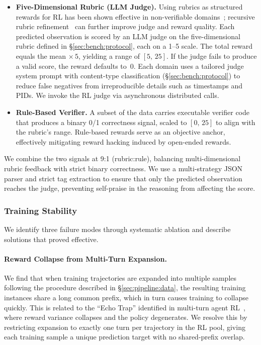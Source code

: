 \documentclass{llmxive}
\begin{document}
\begin{itemize}[leftmargin=1.5em,itemsep=2pt]
    \item \textbf{Five-Dimensional Rubric (LLM Judge).}
    Using rubrics as structured rewards for RL has been shown effective in non-verifiable domains~\citep{gunjal2025rubrics}; recursive rubric refinement~\citep{shen2026rethinking} can further improve judge and reward quality.
    Each predicted observation is scored by an LLM judge on the five-dimensional rubric defined in \S\ref{sec:bench:protocol}, each on a 1--5 scale.
    The total reward equals the mean $\times\,5$, yielding a range of $[5,\,25]$.
    If the judge fails to produce a valid score, the reward defaults to~0.
    Each domain uses a tailored judge system prompt with content-type classification (\S\ref{sec:bench:protocol}) to reduce false negatives from irreproducible details such as timestamps and PIDs.
    We invoke the RL judge via asynchronous distributed calls.

    \item \textbf{Rule-Based Verifier.}
    A subset of the data carries executable verifier code that produces a binary 0/1 correctness signal, scaled to $[0,\,25]$ to align with the rubric's range.
    Rule-based rewards serve as an objective anchor, effectively mitigating reward hacking induced by open-ended rewards.

\end{itemize}

We combine the two signals at 9{:}1 (rubric{:}rule), balancing multi-dimensional rubric feedback with strict binary correctness.
We use a multi-strategy JSON parser and strict tag extraction to ensure that only the predicted observation reaches the judge, preventing self-praise in the reasoning from affecting the score.


\subsubsection{Training Stability}
\label{sec:pipeline:rl:stability}

We identify three failure modes through systematic ablation and describe solutions that proved effective.

\paragraph{Reward Collapse from Multi-Turn Expansion.}
We find that when training trajectories are expanded into multiple samples following the procedure described in \S\ref{sec:pipeline:data}, the resulting training instances share a long common prefix, which in turn causes training to collapse quickly.
This is related to the ``Echo Trap'' identified in multi-turn agent RL~\citep{wang2025ragen}, where reward variance collapses and the policy degenerates.
We resolve this by restricting expansion to exactly one turn per trajectory in the RL pool, giving each training sample a unique prediction target with no shared-prefix overlap.
\end{document}
